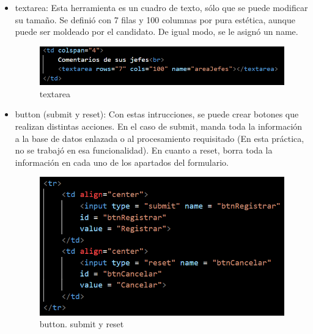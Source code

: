 \documentclass[10pt,a4paper]{article}
\begin{document}
\begin{itemize}
	\item  textarea: Esta herramienta es un cuadro de texto, sólo que se puede modificar su tamaño. Se definió con 7 filas y 100 columnas por pura estética, aunque puede ser moldeado por el candidato. De igual modo, se le asignó un name.
	
	\begin{figure}[H]
		\includegraphics[scale=.54]{Capture9}
		\centering
		\caption{textarea}
		\label{img:Capture9}
	\end{figure} 
	
	\item  button (submit y reset): Con estas intrucciones, se puede crear botones que realizan distintas acciones. En el caso de submit, manda toda la información a la base de datos enlazada o al procesamiento requisitado (En esta práctica, no se trabajó en esa funcionalidad). En cuanto a reset, borra toda la información en cada uno de los apartados del formulario.
	
	\begin{figure}[H]
		\includegraphics[scale=.54]{Capture8}
		\centering
		\caption{button. submit y reset}
		\label{img:Capture8}
	\end{figure} 
	
\end{itemize}

\subsection{
	\textit{
		\color{colorESCOM}{Funcionalidades de la Tabla}
	}
}
\end{document}
